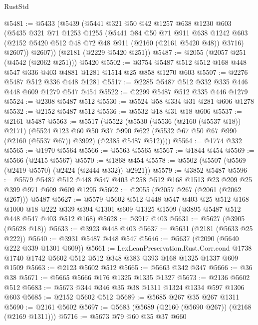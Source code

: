 \begin{lexlean}{RustStd}
\begin{coremodule}
@5481 := @5433
    (@5439
      (@5441
        @321
        @50
        @42
        @1257
        @638
        @1230
        @603
        (@5435
          @321
          @71
          @1253
          @1255
          (@5441
            @84
            @50
            @71
            @911
            @638
            @1242
            @603
            (@2152 @5420 @512 @48 @72 @48 @911 (@2160 (@2161 @5420 @48)) @3716)
            @2607))
        @2607))
    (@2181 (@2229 @5420 @251))
@5487 := @2055 (@2057 @251 (@4542 (@2062 @251))) @5420
@5502 := @3754 @5487 @512 @512 @168 @448 @547 @336 @403 @4881 @1281 @1514 @25 @858 @1270 @603
@5507 := @2276 @5487 @512 @336 @448 @1281
@5517 := @2285 @5487 @512 @332 @335 @446 @448 @609 @1279 @547 @454
@5522 := @2299 @5487 @512 @335 @446 @1279
@5524 := @2308 @5487 @512
@5530 := @5524 @58 @334 @31 @281 @606 @1278
@5532 := @2152 @5487 @512
@5536 := @5532 @18 @31 @18 @606
@5537 := @2161 @5487
@5563 := @5517
    (@5522
      (@5530
        (@5536 (@2160 (@5537 @18)) @2171)
        (@5524
          @123
          @60
          @50
          @37
          @990
          @622
          (@5532 @67 @50 @67 @990 (@2160 (@5537 @67)) @3992)
          (@2385 @5487 @512))))
@5564 := @1774 @332
@5565 := @1970 @5564
@5566 := @5563 @5565
@5567 := @1844 @454
@5569 := @5566 (@2415 @5567)
@5570 := @1868 @454
@5578 := @5502 (@5507 (@5569 (@2419 @5570) (@2424 (@2444 @332)) @2921))
@5579 := @3852 @5487
@5596 := @5579 @5487 @512 @448 @547 @403 @258 @512 @168 @1513 @23 @209 @25 @399 @971 @609 @609 @1295
@5602 := @2055 (@2057 @267 (@2061 (@2062 @267))) @5487
@5627 := @5579
    @5602
    @512
    @448
    @547
    @403
    @25
    @512
    @168
    @1000
    @18
    @222
    @339
    @394
    @1301
    @609
    @1325
    @1509
    (@3895 @5487 @512 @448 @547 @403 @512 @168)
@5628 := @3917 @403
@5631 := @5627 (@3905 (@5628 @18))
@5633 := @3923 @448 @403
@5637 := @5631 (@2181 (@5633 @25 @222))
@5640 := @3931 @5487 @448 @547
@5646 := @5637 (@2090 (@5640 @222 @339 @1301 @609))
@5661 := LexLeanPreservation.Rust.Corr.cond
    @1738
    @1740
    @1742
    @5602
    @512
    @512
    @348
    @383
    @393
    @168
    @1325
    @1337
    @609
    @1509
@5663 := @2123 @5602 @512
@5665 := @5663 @342 @347
@5666 := @36 @38
@5671 := @5665 @5666 @176 @1325 @1335 @1327
@5673 := @2136 @5602 @512
@5683 := @5673 @344 @346 @35 @38 @1311 @1324 @1334 @597 @1306 @603
@5685 := @2152 @5602 @512
@5689 := @5685 @267 @35 @267 @1311
@5690 := @2161 @5602
@5697 := @5683 (@5689 (@2160 (@5690 @267)) (@2168 (@2169 @1311)))
@5716 := @5673
    @79
    @60
    @35
    @37
    @660

\end{coremodule}
\end{lexlean}
